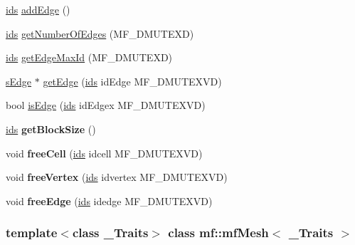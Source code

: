 \begin{DoxyCompactItemize}
\item 
\hyperlink{classmf_1_1mfMesh_a1341cfb4c31ef50c2cb5697b21b4b80e}{ids} \hyperlink{classmf_1_1mfMesh_aba814f5b3081c9d94b87b7bcbaa109a2}{addEdge} ()
\item 
\hyperlink{classmf_1_1mfMesh_a1341cfb4c31ef50c2cb5697b21b4b80e}{ids} \hyperlink{classmf_1_1mfMesh_a0dee34c95a79983a89ba3b90aebad2a2}{getNumberOfEdges} (MF\_\-DMUTEXD)
\item 
\hyperlink{classmf_1_1mfMesh_a1341cfb4c31ef50c2cb5697b21b4b80e}{ids} \hyperlink{classmf_1_1mfMesh_a5fd32be0369858c66bd855c117aa7805}{getEdgeMaxId} (MF\_\-DMUTEXD)
\item 
\hyperlink{classmf_1_1mfMesh_a08b83de804f35261894bab4088146d0b}{sEdge} $\ast$ \hyperlink{classmf_1_1mfMesh_a5fa8595b9a3b194e50675b031f88f921}{getEdge} (\hyperlink{classmf_1_1mfMesh_a1341cfb4c31ef50c2cb5697b21b4b80e}{ids} idEdge MF\_\-DMUTEXVD)
\item 
bool \hyperlink{classmf_1_1mfMesh_a2a7fce0c640138e3d92021d1365cdef4}{isEdge} (\hyperlink{classmf_1_1mfMesh_a1341cfb4c31ef50c2cb5697b21b4b80e}{ids} idEdgex MF\_\-DMUTEXVD)
\item 
\hypertarget{classmf_1_1mfMesh_a9e0e40a56f65ba2df9cd8305f651f36c}{
\hyperlink{classmf_1_1mfMesh_a1341cfb4c31ef50c2cb5697b21b4b80e}{ids} {\bfseries getBlockSize} ()}
\label{classmf_1_1mfMesh_a9e0e40a56f65ba2df9cd8305f651f36c}

\item 
\hypertarget{classmf_1_1mfMesh_a6d4bad3169a319fe4038e41ff4ae0cc1}{
void {\bfseries freeCell} (\hyperlink{classmf_1_1mfMesh_a1341cfb4c31ef50c2cb5697b21b4b80e}{ids} idcell MF\_\-DMUTEXVD)}
\label{classmf_1_1mfMesh_a6d4bad3169a319fe4038e41ff4ae0cc1}

\item 
\hypertarget{classmf_1_1mfMesh_ad0d6707557c56385f57aa33f72d0051c}{
void {\bfseries freeVertex} (\hyperlink{classmf_1_1mfMesh_a1341cfb4c31ef50c2cb5697b21b4b80e}{ids} idvertex MF\_\-DMUTEXVD)}
\label{classmf_1_1mfMesh_ad0d6707557c56385f57aa33f72d0051c}

\item 
\hypertarget{classmf_1_1mfMesh_a0efd46113909bae06f000aa236f3debc}{
void {\bfseries freeEdge} (\hyperlink{classmf_1_1mfMesh_a1341cfb4c31ef50c2cb5697b21b4b80e}{ids} idedge MF\_\-DMUTEXVD)}
\label{classmf_1_1mfMesh_a0efd46113909bae06f000aa236f3debc}

\end{DoxyCompactItemize}
\subsubsection*{template$<$class \_\-Traits$>$ class mf::mfMesh$<$ \_\-Traits $>$}



